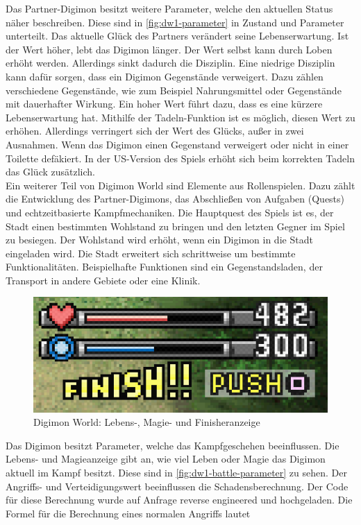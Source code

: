 Das Partner-Digimon besitzt weitere Parameter, welche den aktuellen Status näher beschreiben. Diese sind in \autoref{fig:dw1-parameter} in Zustand und Parameter unterteilt. Das aktuelle Glück des Partners verändert seine Lebenserwartung. Ist der Wert höher, lebt das Digimon länger. Der Wert selbst kann durch Loben erhöht werden. Allerdings sinkt dadurch die Disziplin. Eine niedrige Disziplin kann dafür sorgen, dass ein Digimon Gegenstände verweigert. Dazu zählen verschiedene Gegenstände, wie zum Beispiel Nahrungsmittel oder Gegenstände mit dauerhafter Wirkung. Ein hoher Wert führt dazu, dass es eine kürzere Lebenserwartung hat. Mithilfe der Tadeln-Funktion ist es möglich, diesen Wert zu erhöhen. Allerdings verringert sich der Wert des Glücks, außer in zwei Ausnahmen. Wenn das Digimon einen Gegenstand verweigert oder nicht in einer Toilette defäkiert. In der US-Version des Spiels erhöht sich beim korrekten Tadeln das Glück zusätzlich. \\

Ein weiterer Teil von Digimon World sind Elemente aus Rollenspielen. Dazu zählt die Entwicklung des Partner-Digimons, das Abschließen von Aufgaben (Quests) und echtzeitbasierte Kampfmechaniken. Die Hauptquest des Spiels ist es, der Stadt einen bestimmten Wohlstand zu bringen und den letzten Gegner im Spiel zu besiegen. Der Wohlstand wird erhöht, wenn ein Digimon in die Stadt eingeladen wird. Die Stadt erweitert sich schrittweise um bestimmte Funktionalitäten. Beispielhafte Funktionen sind ein Gegenstandsladen, der Transport in andere Gebiete oder eine Klinik.\\

\begin{figure}[H]
\begin{center}
\includegraphics[width=0.7\columnwidth]{figures/screenshots/battle-parameter.png}
  \caption{\label{fig:dw1-battle-parameter} Digimon World: Lebens-, Magie- und Finisheranzeige}
\end{center}
\end{figure}

Das Digimon besitzt Parameter, welche das Kampfgeschehen beeinflussen. Die Lebens- und Magieanzeige gibt an, wie viel Leben oder Magie das Digimon aktuell im Kampf besitzt. Diese sind in \autoref{fig:dw1-battle-parameter} zu sehen. Der Angriffs- und Verteidigungswert beeinflussen die Schadensberechnung. Der Code für diese Berechnung wurde auf Anfrage reverse engineered und hochgeladen\cite{calculatedamage}. Die Formel für die Berechnung eines normalen Angriffs lautet


